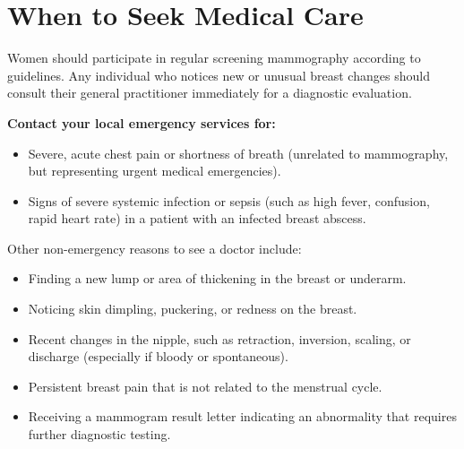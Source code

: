\section*{When to Seek Medical Care}
Women should participate in regular screening mammography according to guidelines. Any individual who notices new or unusual breast changes should consult their general practitioner immediately for a diagnostic evaluation.

\textbf{Contact your local emergency services for:}
\begin{itemize}
    \item Severe, acute chest pain or shortness of breath (unrelated to mammography, but representing urgent medical emergencies).
    \item Signs of severe systemic infection or sepsis (such as high fever, confusion, rapid heart rate) in a patient with an infected breast abscess.
\end{itemize}

Other non-emergency reasons to see a doctor include:
\begin{itemize}
    \item Finding a new lump or area of thickening in the breast or underarm.
    \item Noticing skin dimpling, puckering, or redness on the breast.
    \item Recent changes in the nipple, such as retraction, inversion, scaling, or discharge (especially if bloody or spontaneous).
    \item Persistent breast pain that is not related to the menstrual cycle.
    \item Receiving a mammogram result letter indicating an abnormality that requires further diagnostic testing.
\end{itemize}


